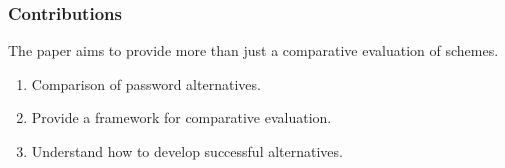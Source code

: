 \documentclass[handout, notes=hide]{beamer}
\begin{document}

\begin{frame}
\frametitle{Contributions}

The paper aims to provide more than just a comparative evaluation of schemes.
\begin{enumerate}
\item Comparison of password alternatives.
\item Provide a framework for comparative evaluation.
\item Understand how to develop successful alternatives.
\end{enumerate}

\end{frame}

\end{document}
